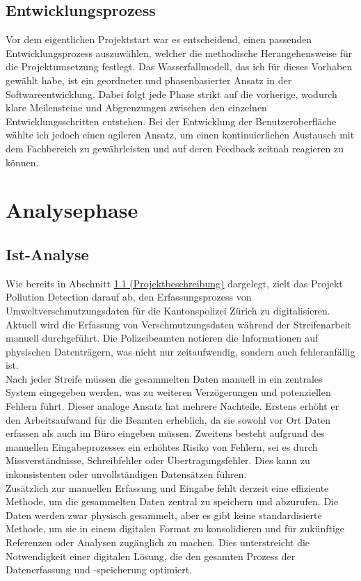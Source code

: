 \documentclass[a4paper,12pt]{article}
\begin{document}
\subsection{Entwicklungsprozess}
\label{sec:entwicklungsprozess}
Vor dem eigentlichen Projektstart war es entscheidend, einen passenden Entwicklungsprozess auszuwählen, welcher die methodische Herangehensweise für die Projektumsetzung festlegt. Das Wasserfallmodell, das ich für dieses Vorhaben gewählt habe, ist ein geordneter und phasenbasierter Ansatz in der Softwareentwicklung. Dabei folgt jede Phase strikt auf die vorherige, wodurch klare Meilensteine und Abgrenzungen zwischen den einzelnen Entwicklungsschritten entstehen. Bei der Entwicklung der Benutzeroberfläche wählte ich jedoch einen agileren Ansatz, um einen kontinuierlichen Austausch mit dem Fachbereich zu gewährleisten und auf deren Feedback zeitnah reagieren zu können.

\section{Analysephase}
\subsection{Ist-Analyse}
\label{sec:Ist-Analyse}
Wie bereits in Abschnitt \hyperref[sec:projektbeschreibung]{1.1 (Projektbeschreibung)} dargelegt, zielt das Projekt \glqq Pollution Detection\grqq{} darauf ab, den Erfassungsprozess von Umweltverschmutzungsdaten für die Kantonspolizei Zürich zu digitalisieren. Aktuell wird die Erfassung von Verschmutzungsdaten während der Streifenarbeit manuell durchgeführt. Die Polizeibeamten notieren die Informationen auf physischen Datenträgern, was nicht nur zeitaufwendig, sondern auch fehleranfällig ist.\\
Nach jeder Streife müssen die gesammelten Daten manuell in ein zentrales System eingegeben werden, was zu weiteren Verzögerungen und potenziellen Fehlern führt. Dieser analoge Ansatz hat mehrere Nachteile. Erstens erhöht er den Arbeitsaufwand für die Beamten erheblich, da sie sowohl vor Ort Daten erfassen als auch im Büro eingeben müssen. Zweitens besteht aufgrund des manuellen Eingabeprozesses ein erhöhtes Risiko von Fehlern, sei es durch Missverständnisse, Schreibfehler oder Übertragungsfehler. Dies kann zu inkonsistenten oder unvollständigen Datensätzen führen.\\
Zusätzlich zur manuellen Erfassung und Eingabe fehlt derzeit eine effiziente Methode, um die gesammelten Daten zentral zu speichern und abzurufen. Die Daten werden zwar physisch gesammelt, aber es gibt keine standardisierte Methode, um sie in einem digitalen Format zu konsolidieren und für zukünftige Referenzen oder Analysen zugänglich zu machen. Dies unterstreicht die Notwendigkeit einer digitalen Lösung, die den gesamten Prozess der Datenerfassung und -speicherung optimiert.
\end{document}
